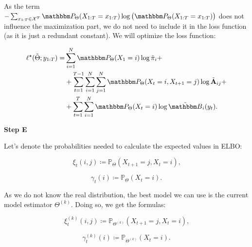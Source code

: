 \documentclass[shortabstract]{iithesis}
\begin{document}
As the term $- \sum_{x_{1:T} \in \mathcal X^T} \mathbbm P_{\Theta}(X_{1:T}=x_{1:T}) \log \big(\mathbbm P_{\Theta}(X_{1:T}=x_{1:T}) \big)$ does not influence the maximization part, we do not need to include it in the loss function (as it is just a redundant constant). We will optimize the loss function:

\begin{equation*}
    \begin{aligned}
        \ell^{\star}(\Tilde{\Theta}; y_{1:T})  = & \sum_{i=1}^N \mathbbm P_{\Theta}(X_{1}=i) \log \Tilde{\pi}_{i}  +\\ 
        & +  \sum_{t=1}^{T-1} \sum_{i=1}^N  \sum_{j=1}^N \mathbbm P_{\Theta}(X_{t}=i, X_{t+1}=j) \log  \Tilde{\textbf{A}}_{ij}  +\\ 
        & +  \sum_{t=1}^T \sum_{i=1}^N \mathbbm P_{\Theta}(X_{t}=i) \log  \Tilde{\mathbbm B}_{i}(y_t) \text{.}
    \end{aligned}
\end{equation*}


\vspace{6mm}

\textbf{Step E}


Let's denote the probabilities needed to calculate the expected values in ELBO:

\begin{equation*}
    \xi_t(i, j) \coloneqq \mathbb P_{\Theta}(X_{t+1} = j, X_{t} = i)\text{,}
\end{equation*}

\begin{equation*}
    \gamma_t(i) \coloneqq \mathbb P_{\Theta}(X_t = i)\text{.}
\end{equation*}

As we do not know the real distribution, the best model we can use is the current model estimator $\Theta^{(k)}$. Doing so, we get the formulas:

\begin{equation*}
    \xi_t^{(k)}(i, j) \coloneqq \mathbb P_{\Theta^{(k)}}(X_{t+1} = j, X_{t} = i)\text{,}
\end{equation*}

\begin{equation*}
    \gamma_t^{(k)}(i) \coloneqq \mathbb P_{\Theta^{(k)}}(X_t = i)\text{.}
\end{equation*}
\end{document}
